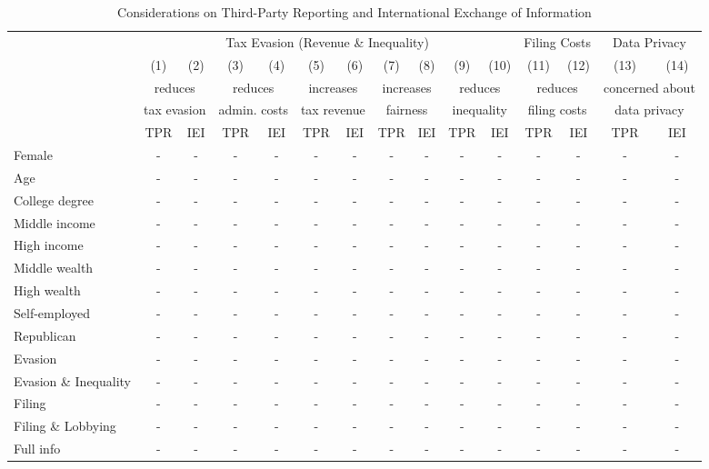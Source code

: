 \documentclass[11pt]{article}
\begin{document}
\begin{landscape}
\begin{table}[!htbp]\centering
\caption{Considerations on Third-Party Reporting and International Exchange of Information}
\label{tab:policyconsiderationstpr}
\begin{threeparttable}
\begin{tabular}{l||cc|cc|cc|cc|cc||cc||cc}
\toprule
 & \multicolumn{10}{c||}{Tax Evasion (Revenue \& Inequality)} & \multicolumn{2}{c||}{Filing Costs} & \multicolumn{2}{c}{Data Privacy}\\[0.5em]
 & (1) & (2)  & (3) & (4) & (5)& (6)& (7)& (8)& (9)& (10)& (11)& (12)& (13)& (14) \\[0.5em]
 & \multicolumn{2}{c|}{reduces} & \multicolumn{2}{c|}{reduces} & \multicolumn{2}{c|}{increases}& \multicolumn{2}{c|}{increases} & \multicolumn{2}{c||}{reduces}  & \multicolumn{2}{c||}{reduces} & \multicolumn{2}{c}{concerned about} \\
 & \multicolumn{2}{c|}{tax evasion} & \multicolumn{2}{c|}{admin. costs} & \multicolumn{2}{c|}{tax revenue} & \multicolumn{2}{c|}{fairness} & \multicolumn{2}{c||}{inequality}& \multicolumn{2}{c||}{filing costs} & \multicolumn{2}{c}{data privacy}  \\[0.5em]
  & TPR & IEI  & TPR & IEI & TPR & IEI & TPR & IEI & TPR & IEI & TPR & IEI & TPR & IEI \\
\midrule
Female                     &-& - & - &-& - & -& - &-& - & -& - &-& - & - \\
Age                        &-& - & - &-& - & -& - &-& - & -& - &-& - & - \\
College degree             &-& - & - &-& - & -& - &-& - & -& - &-& - & - \\
Middle income              &-& - & - &-& - & -& - &-& - & -& - &-& - & - \\
High income                &-& - & - &-& - & -& - &-& - & -& - &-& - & - \\
Middle wealth              &-& - & - &-& - & -& - &-& - & -& - &-& - & - \\
High wealth                &-& - & - &-& - & -& - &-& - & -& - &-& - & - \\
Self-employed              &-& - & - &-& - & -& - &-& - & -& - &-& - & - \\
Republican                 &-& - & - &-& - & -& - &-& - & -& - &-& - & - \\[1em]

Evasion        & - & - & - & - & - & -& - & - & - & -& - & - & - & - \\
Evasion \& Inequality     & - & - & - & - & - & -& - & - & - & -& - & - & - & - \\
Filing            & - & - & - & - & - & -& - & - & - & -& - & - & - & - \\
Filing \& Lobbying           & - & - & - & - & - & -& - & - & - & -& - & - & - & - \\
Full info               & - & - & - & - & - & -& - & - & - & -& - & - & - & - \\[0.5em]


\end{tabular}
\end{threeparttable}
\end{table}
\end{landscape}
\end{document}
